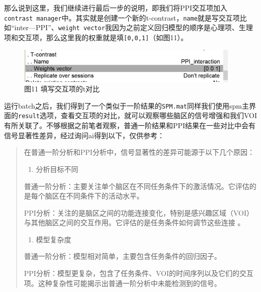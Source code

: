 \documentclass[
]{article}
\providecommand{\tightlist}{%
  \setlength{\itemsep}{0pt}\setlength{\parskip}{0pt}}
\begin{document}
那么说到这里，我们继续进行最后一步的说明，即我们将PPI交互项加入\texttt{contrast\ manager}中。其实就是创建一个新的t-contrast，\texttt{name}就是写交互项比如``inter---PPI''、\texttt{weight\ vector}我因为之前定义回归模型的顺序是心理项、生理项和交互项，那么这里我的权重就是填\texttt{{[}0,0,1{]}}（如图11）。

\begin{figure}
\centering
\includegraphics[width=4.21875in,height=\textheight]{adding_inter_contrast.png}
\caption{图11 填写交互项的t对比}
\end{figure}

运行batch之后，我们得到了一个类似于一阶结果的\texttt{SPM.mat}同样我们使用spm主界面的\texttt{result}选项，查看交互项的对比，就可以观察哪些脑区的信号增强和我们VOI有所关联了。不够根据之前笔者观察，普通一阶结果和PPI结果在一些对比中会有信号显著性差异，经过询问ai得到以下，仅供参考：

\begin{quote}
在普通一阶分析和PPI分析中，信号显著性的差异可能源于以下几个原因：

\begin{enumerate}
\def\labelenumi{\arabic{enumi}.}
\tightlist
\item
  分析目标不同
\end{enumerate}

普通一阶分析：主要关注单个脑区在不同任务条件下的激活情况。它评估的是每个脑区在不同条件下的活动水平。

PPI分析：关注的是脑区之间的功能连接变化，特别是感兴趣区域（VOI）与其他脑区之间的交互作用。它评估的是任务条件如何调节这些连接
。

\begin{enumerate}
\def\labelenumi{\arabic{enumi}.}
\setcounter{enumi}{1}
\tightlist
\item
  模型复杂度
\end{enumerate}

普通一阶分析：模型相对简单，主要包含任务条件的回归因子。

PPI分析：模型更复杂，包含了任务条件、VOI的时间序列以及它们的交互项。这种复杂性可能揭示出普通一阶分析中未能检测到的信号。
\end{quote}
\end{document}
